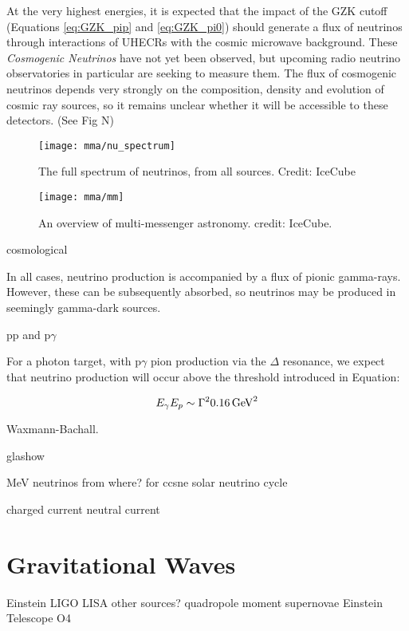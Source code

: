 At the very highest energies, it is expected that the impact of the GZK cutoff (Equations \ref{eq:GZK_pip} and \ref{eq:GZK_pi0}) should generate a flux of neutrinos through interactions of UHECRs with the cosmic microwave background. These \emph{Cosmogenic Neutrinos} have not yet been observed, but upcoming radio neutrino observatories in particular are seeking to measure them. The flux of cosmogenic neutrinos depends very strongly on the composition, density and evolution of cosmic ray sources, so it remains unclear whether it will be accessible to these detectors. (See Fig N)

\begin{figure}[!ht]
	\texttt{[image: mma/nu\_spectrum]}
	\caption{The full spectrum of neutrinos, from all sources. Credit: IceCube}
	\label{fig:nu_spectrum}
\end{figure}

\begin{figure}[!ht]
	\centering \texttt{[image: mma/mm]}
	\caption{An overview of multi-messenger astronomy. credit: IceCube.}
	\label{fig:mm}
\end{figure}

cosmological

In all cases, neutrino production is accompanied by a flux of pionic gamma-rays. However, these can be subsequently absorbed, so neutrinos may be produced in seemingly gamma-dark sources.

pp and p$\gamma$

For a photon target, with p$\gamma$ pion production via the $\Delta$ resonance, we expect that neutrino production will occur above the threshold introduced in Equation:

\begin{equation}
E_{\gamma}E_{p} \sim \Gamma ^{2} 0.16 \,  \textup{GeV}^{2}
\label{eq:delta_res}
\end{equation} 

Waxmann-Bachall.

glashow

MeV neutrinos from where? for ccsne
solar neutrino cycle

charged current
neutral current

\section{Gravitational Waves}

Einstein
LIGO
LISA
other sources?
quadropole moment
supernovae
Einstein Telescope
O4

